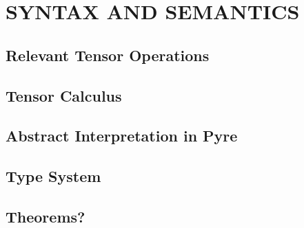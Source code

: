 \section{SYNTAX AND SEMANTICS}
\subsection{Relevant Tensor Operations}
\subsection{Tensor Calculus}
\subsection{Abstract Interpretation in Pyre}
\subsection{Type System}
\subsection{Theorems?}
